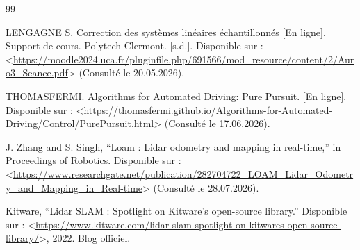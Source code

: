 \begin{thebibliography}{99}

LENGAGNE S. Correction des systèmes linéaires échantillonnés [En ligne]. Support de cours. Polytech Clermont. [s.d.]. Disponible sur : <\href{https://moodle2024.uca.fr/pluginfile.php/691566/mod_resource/content/2/Auro3_Seance.pdf}{https://moodle2024.uca.fr/pluginfile.php/691566/mod\_resource/content/2/Auro3\_Seance.pdf}> (Consulté le 20.05.2026).

THOMASFERMI. Algorithms for Automated Driving: Pure Pursuit. [En ligne]. Disponible sur : <\href{https://thomasfermi.github.io/Algorithms-for-Automated-Driving/Control/PurePursuit.html}{https://thomasfermi.github.io/Algorithms-for-Automated-Driving/Control/PurePursuit.html}> (Consulté le 17.06.2026).

J. Zhang and S. Singh, “Loam : Lidar odometry and mapping in real-time,” in Proceedings of Robotics. Disponible sur : <\href{https://www.researchgate.net/publication/282704722\_LOAM\_Lidar\_Odometry\_and\_Mapping\_in\_Real-time}{https://www.researchgate.net/publication/282704722\_LOAM\_Lidar\_Odometry\_and\_Mapping\_in\_Real-time}> (Consulté le 28.07.2026).

Kitware, “Lidar SLAM : Spotlight on Kitware's open-source library.” Disponible sur : <\href{https://www.kitware.com/lidar-slam-spotlight-on-kitwares-open-source-library/}{https://www.kitware.com/lidar-slam-spotlight-on-kitwares-open-source-library/}>, 2022. Blog officiel.


\end{thebibliography}
